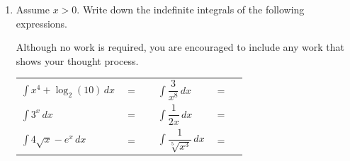 \documentclass[11pt]{article}
\begin{document}
\begin{enumerate}
{\task $\displaystyle\int_{-3}^2 f(x)\, dx$
}


\newpage


\item Assume $x>0$. Write down the indefinite integrals of the following expressions. 

Although no work is required, you are encouraged to include any work that shows your thought process. 


\begin{center}
        \begin{tabular}{l c r l c r}
            $\displaystyle\int x^4+\log_2(10)\,dx$ & $=$ & \rule[-8pt]{1.5in}{0.4pt} &
            $\displaystyle\int \dfrac{3}{x^8} \,dx$ & $=$ & \rule[-8pt]{1.5in}{0.4pt}\\[1in]
            $\displaystyle\int 3^x\,dx$ & $=$ & \rule[-8pt]{1.5in}{0.4pt}&
            $\displaystyle\int \dfrac{1}{2x}\,dx$ & $=$ & \rule[-8pt]{1.5in}{0.4pt}\\[1in]
            $\displaystyle\int 4\sqrt{x}-e^x \,dx$ & $=$ & \rule[-8pt]{1.5in}{0.4pt} & 
            $\displaystyle\int \dfrac{1}{\sqrt[5]{x^3}} \,dx$ & $=$ & \rule[-8pt]{1.5in}{0.4pt}\\[0.3in]
        \end{tabular}
\end{center}


\newpage



\end{enumerate}
\end{document}
